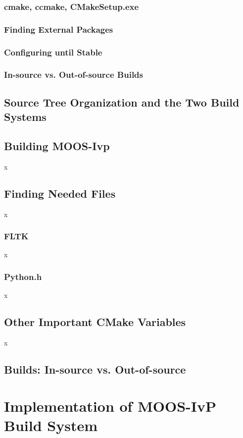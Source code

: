 \documentclass[letterpaper,10pt]{article}
\begin{document}
\subsubsection{cmake, ccmake, CMakeSetup.exe}
\subsubsection{Finding External Packages}
\subsubsection{Configuring until Stable}
\subsubsection{In-source vs. Out-of-source Builds}

\subsection{Source Tree Organization and the Two Build Systems}

\subsection{Building MOOS-Ivp}
x

\subsection{Finding Needed Files}
x

\subsubsection{FLTK}
x

\subsubsection{Python.h}
x

\subsection{Other Important CMake Variables}
x
\subsection{Builds: In-source vs. Out-of-source}

\section{Implementation of MOOS-IvP Build System }
\end{document}
